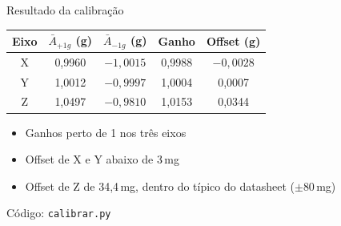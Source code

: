 \documentclass[aspectratio=169]{beamer}
\begin{document}
\begin{frame}{Resultado da calibração}
\begin{center}
\begin{tabular}{ccccc}
\toprule
Eixo & $\bar{A}_{+1g}$ (g) & $\bar{A}_{-1g}$ (g) & Ganho & Offset (g) \\
\midrule
X & 0,9960 & $-1{,}0015$ & 0,9988 & $-0{,}0028$ \\
Y & 1,0012 & $-0{,}9997$ & 1,0004 & 0,0007 \\
Z & 1,0497 & $-0{,}9810$ & 1,0153 & 0,0344 \\
\bottomrule
\end{tabular}
\end{center}
\vspace{6pt}
\begin{itemize}
\item Ganhos perto de 1 nos três eixos
\item Offset de X e Y abaixo de 3\,mg
\item Offset de Z de 34,4\,mg, dentro do típico do datasheet ($\pm80$\,mg)
\end{itemize}
\vspace{2pt}
\centering\scriptsize Código: \texttt{calibrar.py}
\end{frame}
\end{document}
